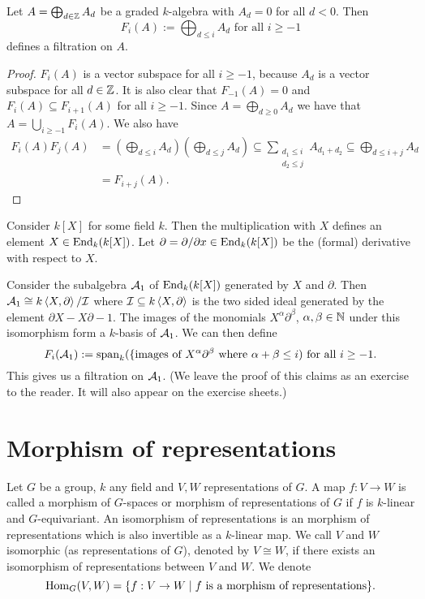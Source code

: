 \begin{lem}
 Let $A = \bigoplus_{d \in \mathbb{Z}} A_d$ be a graded $k$-algebra with $A_d = 0$ for all $d < 0$. Then
 \[
  F_i(A) := \bigoplus_{d \leq i} A_d \text{ for all } i \geq -1
 \]
 defines a filtration on $A$.
\end{lem}
\begin{proof}
 $F_i(A)$ is a vector subspace for all $i \geq -1$, because $A_d$ is a vector subspace for all $d \in \mathbb{Z}$. It is also clear that $F_{-1}(A) = 0$ and $F_i(A) \subseteq F_{i+1}(A)$ for all $i \geq -1$. Since $A = \bigoplus_{d \geq 0} A_d$ we have that $A = \bigcup_{i \geq -1} F_i(A)$. We also have
 \begin{align*}
  F_i(A) F_j(A)
  &= \left( \bigoplus_{d \leq i} A_d \right) \left( \bigoplus_{d \leq j} A_d \right)
  \subseteq \sum_{\substack{d_1 \leq i \\ d_2 \leq j}} A_{d_1 + d_2}
  \subseteq \bigoplus_{d \leq i+j} A_d \\
  &= F_{i+j}(A).
 \end{align*}
\end{proof}


\begin{expl}
 Consider $k[X]$ for some field $k$. Then the multiplication with $X$ defines an element $X \in \operatorname{End}_k(k[X])$. Let $\partial = \partial/\partial x \in \operatorname{End}_k(k[X])$ be the (formal) derivative with respect to $X$.
 
 Consider the subalgebra $\mathcal{A}_1$ of $\operatorname{End}_k(k[X])$ generated by $X$ and $\partial$. Then $\mathcal{A}_1 \cong k\left\langle X,\partial \right\rangle/\mathcal{I}$ where $\mathcal{I} \subseteq k \left\langle X,\partial \right\rangle$ is the two sided ideal generated by the element $\partial X - X \partial - 1$. The images of the monomials $X^\alpha \partial^\beta$, $\alpha, \beta \in \mathbb{N}$ under this isomorphism form a $k$-basis of $\mathcal{A}_1$. We can then define
 \[
  F_i(\mathcal{A}_1) := \operatorname{span}_k(\{\text{images of $X^\alpha \partial^\beta$ where $\alpha+\beta \leq i$}) \text{ for all } i \geq -1.
 \]
 This gives us a filtration on $\mathcal{A}_1$. (We leave the proof of this claims as an exercise to the reader. It will also appear on the exercise sheets.)
\end{expl}


\section{Morphism of representations}


\begin{defi}
Let $G$ be a group, $k$ any field and $V,W$ representations of $G$. A map $f : V \to W$ is called a morphism of $G$-spaces or morphism  of representations of $G$ if $f$ is $k$-linear and $G$-equivariant. An isomorphism of representations is an morphism of representations which is also invertible as a $k$-linear map. We call $V$ and $W$ isomorphic (as representations of $G$), denoted by $V \cong W$, if there exists an isomorphism of representations between $V$ and $W$. We denote
\[
 \operatorname{Hom}_G(V,W) = \{f : V \to W \mid f \text{ is a morphism of representations}\}.
\]
\end{defi}


